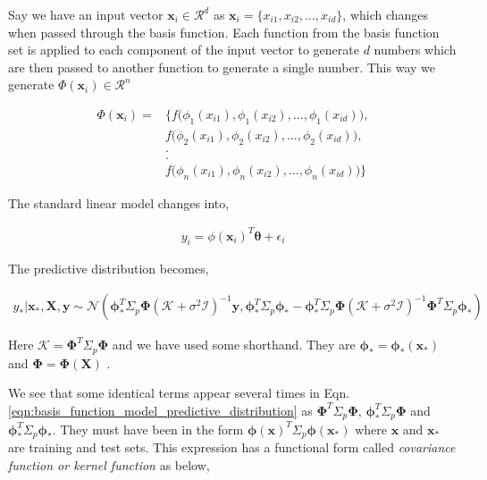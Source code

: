 \documentclass[english]{tktltiki}
\begin{document}
Say we have an input vector $\mathbf{x}_i \in \mathcal{R}^d$ as $\mathbf{x}_i = \{x_{i1}, x_{i2}, ..., x_{id}\}$, which changes when passed through the basis function. Each function from the basis function set is applied to each component of the input vector to generate $d$ numbers which are then passed to another function to generate a single number. This way we generate $\Phi(\mathbf{x}_i) \in \mathcal{R}^n$  

\begin{align}
\label{eqn:basis_function}
	\Phi(\mathbf{x}_i) =  &\Bigg\{f\bigg(\phi_1(x_{i1}), \phi_1(x_{i2}), ..., \phi_1(x_{id})\bigg), \nonumber \\ 
	 &f\bigg(\phi_2(x_{i1}), \phi_2(x_{i2}), ..., \phi_2(x_{id})\bigg), \nonumber \\ 
	 &. \nonumber \\
	 &. \nonumber \\
	 &f\bigg(\phi_n(x_{i1}), \phi_n(x_{i2}), ..., \phi_n(x_{id})\bigg)\Bigg\}
\end{align}

The standard linear model changes into,

\begin{equation}
\label{eqn:basis_function_model}
\begin{split}
	y_i = \phi(\mathbf{x}_i)^T \boldsymbol\theta + \epsilon_i
\end{split}
\end{equation}

The predictive distribution becomes,

\begin{equation}
\label{eqn:basis_function_model_predictive_distribution}
\begin{split}
	y_* | \mathbf{x}_*, \mathbf{X}, \mathbf{y} \sim \mathcal{N}(\boldsymbol\phi_*^T \Sigma_p \boldsymbol\Phi(\mathcal{K} + \sigma^2 \mathcal{I})^{-1} \mathbf{y}, \boldsymbol\phi_*^T \Sigma_p \boldsymbol\phi_* - \boldsymbol\phi_*^T \Sigma_p \boldsymbol\Phi(\mathcal{K} + \sigma^2 \mathcal{I})^{-1} \boldsymbol\Phi^T \Sigma_p \boldsymbol\phi_*)
\end{split}
\end{equation}

Here $\mathcal{K} = \boldsymbol\Phi^T \Sigma_p \boldsymbol\Phi$ and we have used some shorthand. They are $\boldsymbol\phi_* = \boldsymbol\phi_*(\mathbf{x}_*)$ and $\boldsymbol\Phi = \boldsymbol\Phi(\mathbf{X})$ \cite{gaussian_process_for_machine_learning}.

We see that some identical terms appear several times in Eqn. \ref{eqn:basis_function_model_predictive_distribution} as $\boldsymbol\Phi^T \Sigma_p \boldsymbol\Phi$, $\boldsymbol\phi_*^T \Sigma_p \boldsymbol\Phi$ and $\boldsymbol\phi_*^T \Sigma_p \boldsymbol\phi_*$. They must have been in the form $\boldsymbol\phi(\mathbf{x})^T \Sigma_p \boldsymbol\phi(\mathbf{x_*})$ where $\mathbf{x}$ and $\mathbf{x_*}$ are training and test sets. This expression has a functional form called \textit{covariance function or kernel function} as below,
\end{document}
